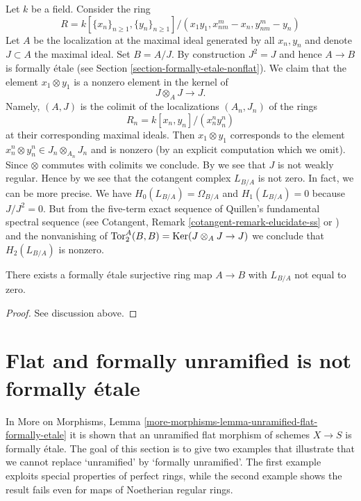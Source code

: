 \noindent
Let $k$ be a field. Consider the ring
$$
R = k[\{x_n\}_{n \geq 1}, \{y_n\}_{n \geq 1}]/(
x_1y_1, x_{nm}^m - x_n, y_{nm}^m - y_n)
$$
Let $A$ be the localization at the maximal ideal generated by
all $x_n, y_n$ and denote $J \subset A$ the maximal ideal. Set $B = A/J$.
By construction $J^2 = J$ and hence $A \to B$ is formally \'etale (see
Section \ref{section-formally-etale-nonflat}).
We claim that the element $x_1 \otimes y_1$ is a nonzero
element in the kernel of
$$
J \otimes_A J \longrightarrow J.
$$
Namely, $(A, J)$ is the colimit of the localizations
$(A_n, J_n)$ of the rings
$$
R_n = k[x_n, y_n]/(x_n^n y_n^n)
$$
at their corresponding maximal ideals. Then
$x_1 \otimes y_1$ corresponds to the element
$x_n^n \otimes y_n^n \in J_n \otimes_{A_n} J_n$ and is nonzero
(by an explicit computation which we omit). Since $\otimes$ commutes
with colimits we conclude. By
\cite[III Section 3.3]{cotangent}
we see that $J$ is not weakly regular. Hence by
\cite[III Proposition 3.3.3]{cotangent}
we see that the cotangent complex $L_{B/A}$ is not zero. In fact, we can
be more precise. We have $H_0(L_{B/A}) = \Omega_{B/A}$ and
$H_1(L_{B/A}) = 0$ because $J/J^2 = 0$. But from the five-term exact sequence
of Quillen's fundamental spectral sequence
(see Cotangent, Remark \ref{cotangent-remark-elucidate-ss} or
\cite[Corollary 8.2.6]{Reinhard})
and the nonvanishing of
$\text{Tor}_2^A(B, B) = \mathop{\mathrm{Ker}}(J \otimes_A J \to J)$ we conclude that
$H_2(L_{B/A})$ is nonzero.

\begin{lemma}
\label{lemma-formally-etale-nontrivial-cotangent-complex}
There exists a formally \'etale surjective ring map $A \to B$
with $L_{B/A}$ not equal to zero.
\end{lemma}

\begin{proof}
See discussion above.
\end{proof}






\section{Flat and formally unramified is not formally \'etale}
\label{section-flat-formally-unramified-not-formally-etale}

\noindent
In More on Morphisms, Lemma
\ref{more-morphisms-lemma-unramified-flat-formally-etale}
it is shown that an unramified flat morphism of schemes $X \to S$
is formally \'etale. The goal of this section is to give two examples
that illustrate that we cannot replace `unramified' by `formally unramified'.
The first example exploits special properties of perfect rings, while the
second example shows the result fails even for maps of Noetherian regular rings.


